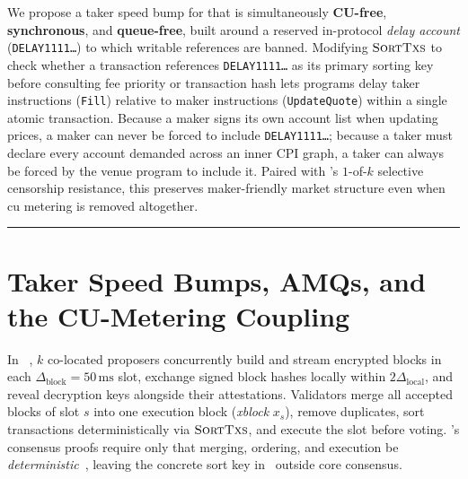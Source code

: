 \documentclass[10pt,a4paper]{article}
\newcommand{\DelayAcct}{\texttt{DELAY1111\allowbreak\dots}}
\newcommand{\SortTxs}{\textsc{SortTxs}}
\newcommand{\NewCon}{\text{NewCon}}
\begin{document}
\begin{titlepage}
\begin{minipage}{0.84\textwidth}
\medskip\noindent
We propose a taker speed bump for \NewCon{} that is simultaneously \textbf{CU-free}, \textbf{synchronous}, and \textbf{queue-free}, built around a reserved in-protocol \emph{delay account} (\DelayAcct) to which writable references are banned. Modifying $\SortTxs$ to check whether a transaction references \DelayAcct{} as its primary sorting key before consulting fee priority or transaction hash lets programs delay taker instructions (\texttt{Fill}) relative to maker instructions (\texttt{UpdateQuote}) within a single atomic transaction. Because a maker signs its own account list when updating prices, a maker can never be forced to include \DelayAcct{}; because a taker must declare every account demanded across an inner CPI graph, a taker can always be forced by the venue program to include it. Paired with \NewCon's $1$-of-$k$ selective censorship resistance, this preserves maker-friendly market structure even when $\mathrm{cu}$ metering is removed altogether.
\end{minipage}

\vspace{0.65cm}
\rule{0.86\textwidth}{0.5pt}
\vfill
\end{titlepage}

\setcounter{page}{2}

\section{Taker Speed Bumps, AMQs, and the CU-Metering Coupling}

In \NewCon~\cite{KW26c}, $k$ co-located proposers concurrently build and stream encrypted blocks in each $\Delta_{\text{block}} = 50\,\text{ms}$ slot, exchange signed block hashes locally within $2\Delta_{\text{local}}$, and reveal decryption keys alongside their attestations. Validators merge all accepted blocks of slot $s$ into one execution block (\emph{xblock} $x_s$), remove duplicates, sort transactions deterministically via $\SortTxs$, and execute the slot before voting. \NewCon's consensus proofs require only that merging, ordering, and execution be \emph{deterministic}~\cite[Sec.~2.6]{KW26c}, leaving the concrete sort key in~\cite[Sec.~3.3]{KW26c} outside core consensus.
\end{document}
